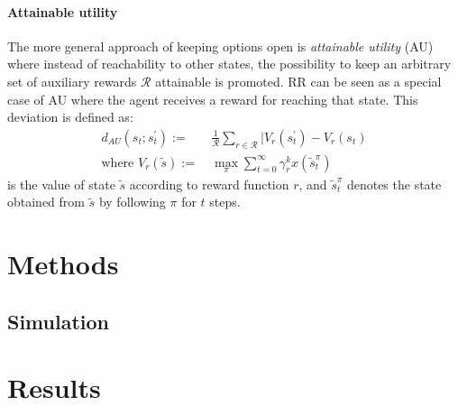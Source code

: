 \documentclass[12pt,A4]{report}
\theoremstyle{definition}
\begin{document}
\subsubsection{Attainable utility}
The more general approach of keeping options open is \textit{attainable utility} (AU) where instead of reachability to other states, the possibility to keep an arbitrary set of auxiliary rewards $\mathcal{R}$ attainable is promoted. RR can be seen as a special case of AU where the agent receives a reward for reaching that state. This deviation is defined as:
\begin{align*}
  d_{AU}(s_t;s_t^\prime) := & \ \frac{1}{\mathcal{R}} \sum_{r\in\mathcal{R}} |V_r(s_t^\prime) - V_r(s_t) \\
  \text{where } V_r(\tilde{s}) := & \ \max_\pi \sum_{t=0}^\infty \gamma_r^k x(\tilde{s}_t^\pi)
\end{align*}
is the value of state $\tilde{s}$ according to reward function $r$, and $\tilde{s}_t^\pi$ denotes the state obtained from $\tilde{s}$ by following $\pi$ for $t$ steps.





\chapter{Methods}

\section{Simulation}





\chapter{Results}
\end{document}
